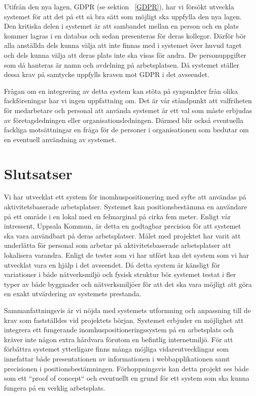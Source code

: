 \documentclass[a4paper,12pt]{article}
\begin{document}
Utifrån den nya lagen, GDPR (se sektion ~\ref{GDPR}), har vi försökt utveckla systemet för att det på ett så bra sätt som möjligt ska uppfylla den nya lagen.  Den kritiska delen i systemet är att sambandet mellan en person och en plats kommer lagras i en databas och sedan presenteras för deras kollegor. Därför bör alla anställda dels kunna välja att inte finnas med i systemet över huvud taget och dels kunna välja att deras plats inte ska visas för andra. De personuppgifter som då hanteras är namn och avdelning på arbetsplatsen. Då systemet ställer dessa krav på samtycke uppfylls kraven mot GDPR i det avseendet.

Frågan om en integrering av detta system kan stöta på synpunkter från olika \\fackföreningar har vi ingen uppfattning om. Det är vår ståndpunkt att valfriheten för medarbetare och personal att använda systemet är ett val som måste erbjudas av företagsledningen eller organisationsledningen. Därmed blir också eventuella fackliga motsättningar en fråga för de personer i organisationen som beslutar om en eventuell användning av systemet.



\section{Slutsatser}

Vi har utvecklat ett system för inomhuspositionering med syfte att användas på aktivitetsbaserade arbetsplatser. Systemet kan positionsbestämma en användare på ett område i en lokal med en felmarginal på cirka fem meter. Enligt vår intressent, Uppsala Kommun, är detta en godtagbar precision för att systemet ska vara användbart på deras arbetsplatser. Målet med projektet har varit att underlätta för personal som arbetar på aktivitetsbaserade arbetsplatser att lokalisera varandra. Enligt de tester som vi har utfört kan det system som vi har utvecklat vara en hjälp i det avseendet.
Då detta system är känsligt för variationer i både nätverksmiljö och fysisk struktur bör systemet testat i fler typer av både byggnader och nätverksmiljöer för att det ska vara möjligt att göra en exakt utvärdering av systemets prestanda.

Sammanfattningsvis är vi nöjda med systemets utformning och anpassning till de krav som fastställdes vid projektets början. Systemet erbjuder en möjlighet att integrera ett fungerande inomhuspositioneringssystem på en arbetsplats och kräver inte någon extra hårdvara förutom en befintlig internetmiljö. För att förbättra systemet ytterligare finns många möjliga vidareutvecklingar som innefattar både presentationen av informationen i webbapplikationen samt precisionen i positionsbestämningen. Förhoppningsvis kan detta projekt ses både som ett ``proof of concept`` och eventuellt en grund för ett system som ska kunna fungera på en verklig arbetsplats.
\end{document}
